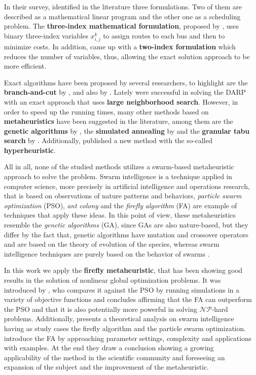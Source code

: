 \documentclass[tuberlin,cic,tc,openright,english,noabntcite,oneside]{iiufrgs}
\begin{document}
In their survey, \textcite{cordeau_dial--ride_2007} identified in the literature three formulations. Two of them are described as a mathematical linear program and the other one as a scheduling problem. The \textbf{three-index mathematical formulation}, proposed by \textcite{cordeau_branch-and-cut_2006}, uses binary three-index variables $x_{i,j}^{k}$ to assign routes to each bus and then to minimize costs. In addition, \textcite{ropke_models_2007} came up with a \textbf{two-index formulation} which reduces the number of variables, thus, allowing the exact solution approach to be more efficient.

Exact algorithms have been proposed by several researchers, to highlight are the \textbf{branch-and-cut} by \textcite{cordeau_branch-and-cut_2006}, and also by \textcite{ropke_models_2007}. Lately \textcite{parragh_hybrid_2013} were successful in solving the DARP with an exact approach that uses \textbf{large neighborhood search}. However, in order to speed up the running times, many other methods based on \textbf{metaheuristics} have been suggested in the literature, among them are the \textbf{genetic algorithms} by \textcite{jorgensen_solving_2007}, the \textbf{simulated annealing} by \textcite{zidi_multi-objective_2012} and the \textbf{granular tabu search} by \textcite{kirchler_granular_2013}. Additionally, \textcite{urra_hyperheuristic_2015} published a new method with the so-called \textbf{hyperheuristic}.

All in all, none of the studied methods utilizes a swarm-based metaheuristic approach to solve the problem. Swarm intelligence is a technique applied in computer science, more precisely in artificial intelligence and operations research, that is based on observations of nature patterns and behaviors, \emph{particle swarm optimization} (PSO), \emph{ant colony} and the \emph{firefly algorithm} (FA) are example of techniques that apply these ideas. In this point of view, these metaheuristics resemble the \emph{genetic algorithms} (GA), since GAs are also nature-based, but they differ by the fact that, genetic algorithms have mutation and crossover operators and are based on the theory of evolution of the species, whereas swarm intelligence techniques are purely based on the behavior of swarms \parencite[p. 189-190]{yang_efficiency_2012}.

In this work we apply the \textbf{firefly metaheuristic}, that has been showing good results in the solution of nonlinear global optimization problems. It was introduced by \textcite{yang_firefly_2009}, who compares it against the PSO by running simulations in a variety of objective functions and concludes affirming that the FA can outperform the PSO and that it is also potentially more powerful in solving $\mathcal{NP}$-hard problems. Additionally, \textcite{yang_efficiency_2012} presents a theoretical analysis on swarm intelligence having as study cases the firefly algorithm and the particle swarm optimization. \textcite{yang_firefly_2013} introduce the FA by approaching parameter settings, complexity and applications with examples. At the end they draw a conclusion showing a growing applicability of the method in the scientific community and foreseeing an expansion of the subject and the improvement of the metaheuristic.
\end{document}
